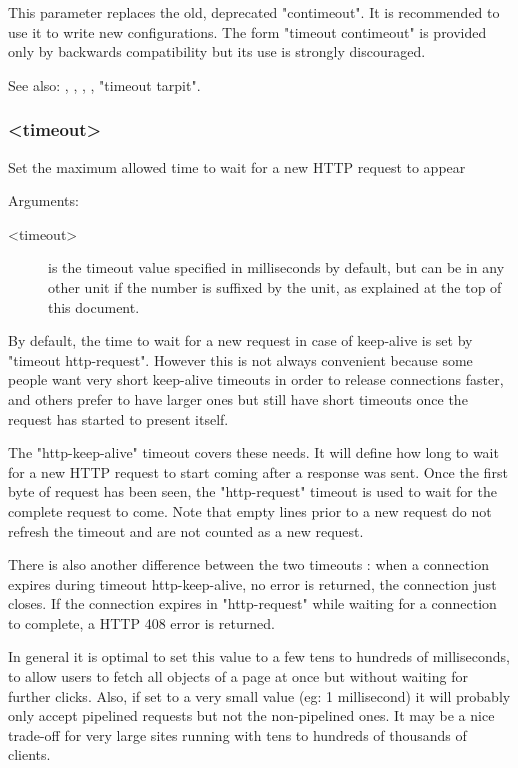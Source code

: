   This parameter replaces the old, deprecated "contimeout". It is recommended
  to use it to write new configurations. The form "timeout contimeout" is
  provided only by backwards compatibility but its use is strongly discouraged.


See also: , , , ,
            "timeout tarpit".

\subsubsection[timeout http-keep-alive]{ <timeout>}

  Set the maximum allowed time to wait for a new HTTP request to appear


  Arguments:
  \begin{description}
  \item[<timeout>] is the timeout value specified in milliseconds by default, but
              can be in any other unit if the number is suffixed by the unit,
              as explained at the top of this document.
  \end{description}

  By default, the time to wait for a new request in case of keep-alive is set
  by "timeout http-request". However this is not always convenient because some
  people want very short keep-alive timeouts in order to release connections
  faster, and others prefer to have larger ones but still have short timeouts
  once the request has started to present itself.

  The "http-keep-alive" timeout covers these needs. It will define how long to
  wait for a new HTTP request to start coming after a response was sent. Once
  the first byte of request has been seen, the "http-request" timeout is used
  to wait for the complete request to come. Note that empty lines prior to a
  new request do not refresh the timeout and are not counted as a new request.

  There is also another difference between the two timeouts : when a connection
  expires during timeout http-keep-alive, no error is returned, the connection
  just closes. If the connection expires in "http-request" while waiting for a
  connection to complete, a HTTP 408 error is returned.

  In general it is optimal to set this value to a few tens to hundreds of
  milliseconds, to allow users to fetch all objects of a page at once but
  without waiting for further clicks. Also, if set to a very small value (eg:
  1 millisecond) it will probably only accept pipelined requests but not the
  non-pipelined ones. It may be a nice trade-off for very large sites running
  with tens to hundreds of thousands of clients.

